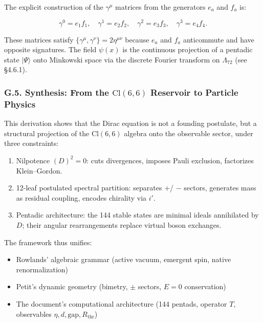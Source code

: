 \documentclass[11pt]{article}
\providecommand{\tightlist}{\setlength{\itemsep}{2pt}\setlength{\parskip}{6pt}}
\providecommand{\tightlist}{%
  \setlength{\itemsep}{2pt}\setlength{\parskip}{6pt}
}
\begin{document}
The explicit construction of the \(\gamma^\mu\) matrices from the
generators \(e_a\) and \(f_a\) is:

\[
\gamma^0 = e_1 f_1, \quad \gamma^1 = e_2 f_2, \quad \gamma^2 = e_3 f_3, \quad \gamma^3 = e_4 f_4.
\]

These matrices satisfy \(\{\gamma^\mu, \gamma^\nu\} = 2\eta^{\mu\nu}\)
because \(e_a\) and \(f_a\) anticommute and have opposite signatures.
The field \(\psi(x)\) is the continuous projection of a pentadic state
\(|\Psi\rangle\) onto Minkowski space via the discrete Fourier transform
on \(\Lambda_{72}\) (see §4.6.1).

\hypertarget{g.5.-synthesis-from-the-textcl66-reservoir-to-particle-physics}{%
\subsubsection{\texorpdfstring{G.5. Synthesis: From the
\(\text{Cl}(6,6)\) Reservoir to Particle
Physics}{G.5. Synthesis: From the \textbackslash text\{Cl\}(6,6) Reservoir to Particle Physics}}\label{g.5.-synthesis-from-the-textcl66-reservoir-to-particle-physics}}

This derivation shows that the Dirac equation is not a founding
postulate, but a structural projection of the \(\text{Cl}(6,6)\) algebra
onto the observable sector, under three constraints:

\begin{enumerate}
\def\labelenumi{\arabic{enumi}.}
\tightlist
\item
  Nilpotence \((D)^2=0\): cuts divergences, imposes Pauli exclusion,
  factorizes Klein--Gordon.
\item
  12-leaf postulated spectral partition: separates \(+\)/ \(-\) sectors,
  generates mass as residual coupling, encodes chirality via \(i'\).
\item
  Pentadic architecture: the 144 stable states are minimal ideals
  annihilated by \(D\); their angular rearrangements replace virtual
  boson exchanges.
\end{enumerate}

The framework thus unifies:

\begin{itemize}
\tightlist
\item
  Rowlands' algebraic grammar (active vacuum, emergent spin, native
  renormalization)
\item
  Petit's dynamic geometry (bimetry, \(\pm\) sectors, \(E=0\)
  conservation)
\item
  The document's computational architecture (144 pentads, operator
  \(T\), observables \(\eta,d,\text{gap},R_{\text{thr}}\))
\end{itemize}
\end{document}
